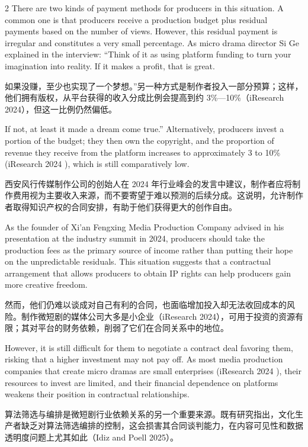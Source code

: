 \documentclass[10pt,a4paper]{article}
\begin{document}
\begin{paracol}{2}
\switchcolumn
There are two kinds of payment methods for producers in this situation. A common one is that producers receive a production budget plus residual payments based on the number of views. However, this residual payment is irregular and constitutes a very small percentage. As micro drama director Si Ge explained in the interview: “Think of it as using platform funding to turn your imagination into reality. If it makes a profit, that is great.\par
\switchcolumn*
如果没赚，至少也实现了一个梦想。”另一种方式是制作者投入一部分预算；这样，他们拥有版权，从平台获得的收入分成比例会提高到约 3\%—10\%（iResearch 2024），但这一比例仍然偏低。\par
\switchcolumn
If not, at least it made a dream come true.” Alternatively, producers invest a portion of the budget; they then own the copyright, and the proportion of revenue they receive from the platform increases to approximately 3 to 10\% (iResearch 2024 ), which is still comparatively low.\par
\switchcolumn*
西安风行传媒制作公司的创始人在 2024 年行业峰会的发言中建议，制作者应将制作费用视为主要收入来源，而不要寄望于难以预测的后续分成。这说明，允许制作者取得知识产权的合同安排，有助于他们获得更大的创作自由。\par
\switchcolumn
As the founder of Xi’an Fengxing Media Production Company advised in his presentation at the industry summit in 2024, producers should take the production fees as the primary source of income rather than putting their hope on the unpredictable residuals. This situation suggests that a contractual arrangement that allows producers to obtain IP rights can help producers gain more creative freedom.\par
\switchcolumn*
然而，他们仍难以谈成对自己有利的合同，也面临增加投入却无法收回成本的风险。制作微短剧的媒体公司大多是小企业（iResearch 2024），可用于投资的资源有限；其对平台的财务依赖，削弱了它们在合同关系中的地位。\par
\switchcolumn
However, it is still difficult for them to negotiate a contract deal favoring them, risking that a higher investment may not pay off. As most media production companies that create micro dramas are small enterprises (iResearch 2024 ), their resources to invest are limited, and their financial dependence on platforms weakens their position in contractual relationships.\par
\switchcolumn*
算法筛选与编排是微短剧行业依赖关系的另一个重要来源。既有研究指出，文化生产者缺乏对算法筛选编排的控制，这会损害其合同谈判能力，在内容可见性和数据透明度问题上尤其如此（Idiz and Poell 2025）。\par

\end{paracol}
\end{document}

